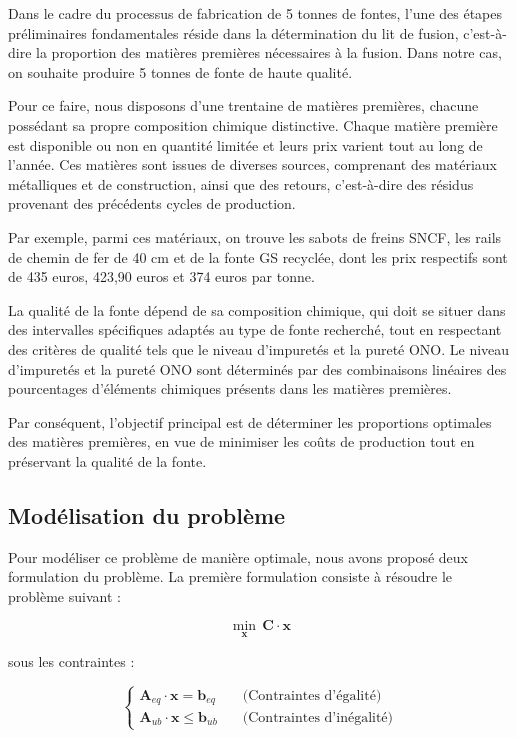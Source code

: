 \documentclass[12pt]{article}
\begin{document}
Dans le cadre du processus de fabrication de 5 tonnes de fontes, l'une des
étapes préliminaires fondamentales réside dans la détermination du lit de
fusion, c'est-à-dire la proportion des matières premières nécessaires à la 
fusion. Dans notre cas, on souhaite produire 5 tonnes de fonte de haute 
qualité.

Pour ce faire, nous disposons d'une trentaine de matières premières, 
chacune possédant sa propre composition chimique distinctive. Chaque 
matière première est disponible ou non en quantité limitée et leurs prix 
varient tout au long de l'année. Ces matières sont issues de diverses 
sources, comprenant des matériaux métalliques et de construction, ainsi 
que des retours, c'est-à-dire des résidus provenant des précédents cycles 
de production.

Par exemple, parmi ces matériaux, on trouve les sabots de freins SNCF, les 
rails de chemin de fer de 40 cm et de la fonte GS recyclée, dont les prix 
respectifs sont de 435 euros, 423,90 euros et 374 euros par tonne.

La qualité de la fonte dépend de sa composition chimique, qui doit se 
situer dans des intervalles spécifiques adaptés au type de fonte recherché,
tout en respectant des critères de qualité tels que le niveau d'impuretés 
et la pureté ONO. Le niveau d'impuretés et la pureté ONO sont déterminés 
par des combinaisons linéaires des pourcentages d'éléments chimiques 
présents dans les matières premières.

Par conséquent, l'objectif principal est de déterminer les proportions 
optimales des matières premières, en vue de minimiser les coûts de 
production tout en préservant la qualité de la fonte.






\subsection{ Modélisation du problème }

Pour modéliser ce problème de manière optimale, nous avons proposé 
deux formulation du problème. La première formulation consiste à résoudre 
le problème suivant :

\[
\underset{\mathbf{x}}{\min} \, \mathbf{C} \cdot \mathbf{x}
\]

sous les contraintes :

$$
\begin{cases}
\mathbf{A}_{eq} \cdot \mathbf{x} = \mathbf{b}_{eq} \quad &\text{(Contraintes d'égalité)} \\
\mathbf{A}_{ub} \cdot \mathbf{x} \leq \mathbf{b}_{ub} \quad &\text{(Contraintes d'inégalité)}
\end{cases}
$$
\end{document}
